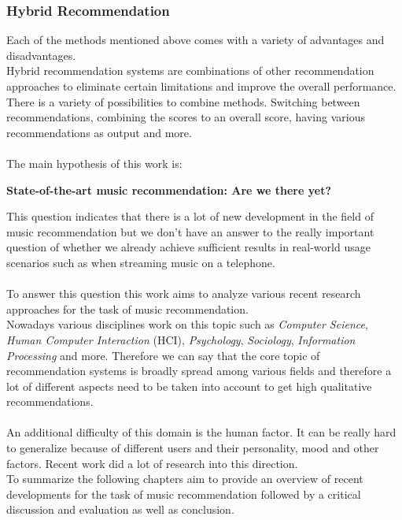 \documentclass[runningheads,a4paper]{llncs}
\begin{document}
\subsubsection{Hybrid Recommendation}
Each of the methods mentioned above comes with a variety of advantages and disadvantages. \\
Hybrid recommendation systems are combinations of other recommendation approaches to eliminate certain 
limitations and improve the overall performance. 
There is a variety of possibilities to combine methods.
Switching between recommendations, combining the scores to an overall score, having various recommendations as output
 and more. \cite{burke2002hybrid}\\
\\
The main hypothesis of this work is:
\begin{center}
  \textbf{State-of-the-art music recommendation: Are we there yet?}
\end{center}
This question indicates that there is a lot of new development in the field of music recommendation but we don't have an answer to the really important question of whether we already achieve 
sufficient results in real-world usage scenarios such as when streaming music on a telephone.\\
\\
To answer this question this work aims to analyze various recent research approaches for the task of music recommendation.\\
Nowadays various disciplines work on this topic such as \textit{Computer Science}, \textit{Human Computer Interaction} (HCI), 
\textit{Psychology}, \textit{Sociology}, \textit{Information Processing} and more. 
Therefore we can say that the core topic of recommendation systems is broadly spread among various fields and therefore 
a lot of different aspects need to be taken into account to get high qualitative recommendations. \\
\\
An additional difficulty of this domain is the human factor. It can be really hard to generalize because of 
different users and their personality, mood and other factors. Recent work did a lot of research into this direction.\\
To summarize the following chapters aim to provide an overview of recent developments for the task of music recommendation 
followed by a critical discussion and evaluation as well as conclusion. 
\end{document}
